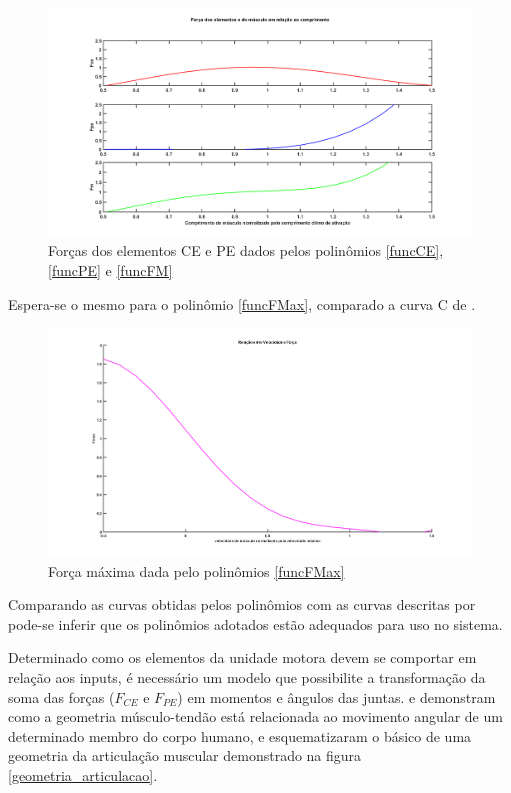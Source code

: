 \begin{figure}[H]
\centering
\includegraphics[width = 1\textwidth]{img/forcas_elementos.png}
\caption[Forças dos Elementos CE e PE]{Forças dos elementos CE e PE dados pelos polinômios \ref{funcCE},\ref{funcPE} e \ref{funcFM}}
\label{graficos_forcas_elementos}
\end{figure}

Espera-se o mesmo para o polinômio \ref{funcFMax}, comparado a curva C de \cite{zajac1989muscle}.

\begin{figure}[H]
\centering
\includegraphics[width = 1\textwidth]{img/forca_velocidade.png}
\caption[Relação Fmax e Velocidade do Músculo]{Força máxima dada pelo polinômios \ref{funcFMax}}
\label{graficos_forcas_elementos}
\end{figure}

Comparando as curvas obtidas pelos polinômios com as curvas descritas por \cite{zajac1989muscle} pode-se inferir que os polinômios adotados estão adequados para uso no sistema.

Determinado como os elementos da unidade motora devem se comportar em relação aos inputs, é necessário um modelo que possibilite a transformação da soma das forças ($F_{CE}$ e $F_{PE}$) em momentos e ângulos das juntas. \cite{giat1994simulation} e \cite{rosen1999performances} demonstram como a geometria músculo-tendão está relacionada ao movimento angular de um determinado membro do corpo humano, \cite{feng1999surface} e \cite{winters1988estimated} esquematizaram o básico de uma geometria da articulação muscular demonstrado na figura \ref{geometria_articulacao}.

